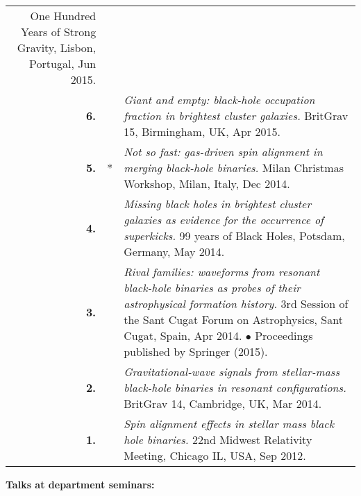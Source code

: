 {\begin{longtable}{rp{0.3cm}p{15.8cm}}
\newline{}
One Hundred Years of Strong Gravity, Lisbon, Portugal, Jun 2015.
\vspace{0.05cm}\\
%
\textbf{6.} &  & \textit{Giant and empty: black-hole occupation fraction in brightest cluster galaxies.}
\newline{}
BritGrav 15, Birmingham, UK, Apr 2015.
\vspace{0.05cm}\\
%
\textbf{5.} & * & \textit{Not so fast: gas-driven spin alignment in merging black-hole binaries.}
\newline{}
Milan Christmas Workshop, Milan, Italy, Dec 2014.
\vspace{0.05cm}\\
%
\textbf{4.} &  & \textit{Missing black holes in brightest cluster galaxies as evidence for the occurrence of superkicks.}
\newline{}
99 years of Black Holes, Potsdam, Germany, May 2014.
\vspace{0.05cm}\\
%
\textbf{3.} &  & \textit{Rival families: waveforms from resonant black-hole binaries as probes of their astrophysical formation history.}
\newline{}
3rd Session of the Sant Cugat Forum on Astrophysics, Sant Cugat, Spain, Apr 2014.
\newline{}
\textcolor{color1}{$\bullet$} Proceedings published by Springer (2015).
\vspace{0.05cm}\\
%
\textbf{2.} &  & \textit{Gravitational-wave signals from stellar-mass black-hole binaries in resonant configurations.}
\newline{}
BritGrav 14, Cambridge, UK, Mar 2014.
\vspace{0.05cm}\\
%
\textbf{1.} &  & \textit{Spin alignment effects in stellar mass black hole binaries.}
\newline{}
22nd Midwest Relativity Meeting, Chicago IL, USA, Sep 2012.
\vspace{0.05cm}\\
%
\end{longtable} }
\textcolor{color1}{\textbf{Talks at department seminars:}}
\vspace{-0.5cm}

